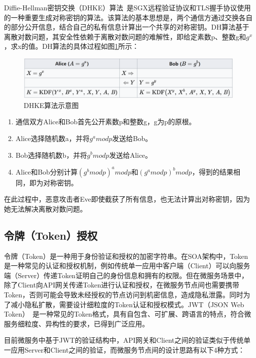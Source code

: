 Diffie-Hellman密钥交换（DHKE）算法~\cite{diffie2022new}是SGX远程验证协议和TLS握手协议使用的一种重要生成对称密钥的算法。该算法的基本思想是，两个通信方通过交换各自的部分公开信息，结合自己的私有信息计算出一个共享的对称密钥。DH算法基于离散对数问题，其安全性依赖于离散对数问题的难解性，即给定素数p、整数g和$g^x$，求x的值。DH算法的具体过程如图\ref{fig:dhke}所示：

\begin{figure}[!ht]
    \centering
    \includegraphics[width=.7\textwidth]{figures/DHKE.svg}
    \caption{DHKE算法示意图}
    \label{fig:dhke}
\end{figure}


\begin{enumerate}
    \item 通信双方Alice和Bob首先公开素数p和整数g，g为p的原根。
    \item Alice选择随机数a，并将$g^a mod p$发送给Bob。
    \item Bob选择随机数b，并将$g^b mod p$发送给Alice。
    \item Alice和Bob分别计算$(g^b mod p)^a mod p$和$(g^a mod p)^b mod p$，得到的结果相同，即为对称密钥。
\end{enumerate}

在此过程中，恶意攻击者Eve即使截获了所有信息，也无法计算出对称密钥，因为她无法解决离散对数问题。

\subsection{令牌（Token）授权}\label{subsec:token}

令牌（Token）是一种用于身份验证和授权的加密字符串。在SOA架构中，Token是一种常见的认证和授权机制，例如传统单一应用中客户端（Client）可以向服务端（Server）传递Token证明自己的身份信息和拥有的权限。但在微服务场景中，除了Client向API网关传递Token进行认证和授权，在微服务节点间也需要携带Token，否则可能会导致未经授权的节点访问到机密信息，造成隐私泄露。同时为了减小隐私扩散，需要设计细粒度的Token认证和授权模式。JWT（JSON Web Token）~\cite{rfc7519}是一种常见的Token格式，具有自包含、可扩展、跨语言的特点，符合微服务细粒度、异构性的要求，已得到广泛应用。

目前微服务中基于JWT的验证结构中，API网关和Client之间的验证类似于传统单一应用Server和Client之间的验证，而微服务节点间的设计思路有以下4种方式：

